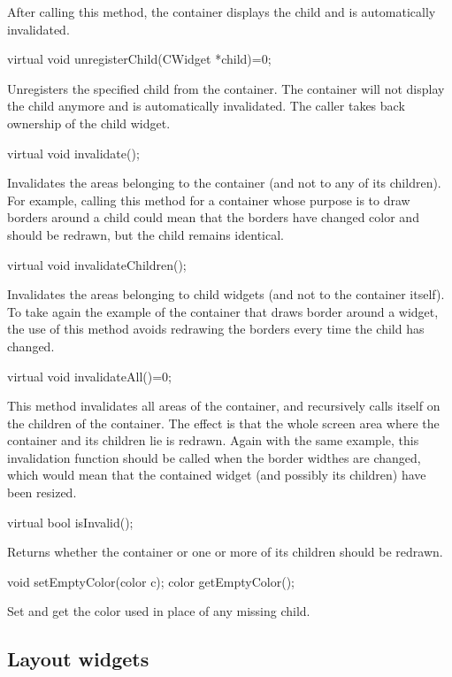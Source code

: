 \documentclass[a4paper,11pt]{journal}
\begin{document}
After calling this method, the container displays the child and is automatically invalidated.\\
\begin{verbatimtab}virtual void unregisterChild(CWidget *child)=0;\end{verbatimtab}
Unregisters the specified child from the container. The container will not display the child anymore and is automatically invalidated. The caller takes back ownership of the child widget.\\
\begin{verbatimtab}virtual void invalidate();\end{verbatimtab}
Invalidates the areas belonging to the container (and not to any of its children). For example, calling this method for a container whose purpose is to draw borders around a child could mean that the borders have changed color and should be redrawn, but the child remains identical.\\
\begin{verbatimtab}virtual void invalidateChildren();\end{verbatimtab}
Invalidates the areas belonging to child widgets (and not to the container itself). To take again the example of the container that draws border around a widget, the use of this method avoids redrawing the borders every time the child has changed.\\
\begin{verbatimtab}virtual void invalidateAll()=0;\end{verbatimtab}
This method invalidates all areas of the container, and recursively calls itself on the children of the container. The effect is that the whole screen area where the container and its children lie is redrawn. Again with the same example, this invalidation function should be called when the border widthes are changed, which would mean that the contained widget (and possibly its children) have been resized.\\
\begin{verbatimtab}virtual bool isInvalid();\end{verbatimtab}
Returns whether the container or one or more of its children should be redrawn.\\
\begin{verbatimtab}
void setEmptyColor(color c);
color getEmptyColor();
\end{verbatimtab}
Set and get the color used in place of any missing child.

\subsection{Layout widgets}
\end{document}
